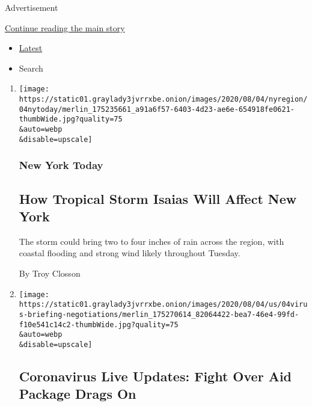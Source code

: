 Advertisement

\protect\hyperlink{after-mid1}{Continue reading the main story}

\begin{itemize}
\tightlist
\item
  \protect\hyperlink{stream-panel}{Latest}
\item
  Search
\end{itemize}

\begin{enumerate}
\def\labelenumi{\arabic{enumi}.}
\item
  \href{/2020/08/04/nyregion/isaias-tropical-storm-nyc.html}{}

  \texttt{[image: https://static01.graylady3jvrrxbe.onion/images/2020/08/04/nyregion/04nytoday/merlin\_175235661\_a91a6f57-6403-4d23-ae6e-654918fe0621-thumbWide.jpg?quality=75\\\&auto=webp\\\&disable=upscale]}

  \hypertarget{new-york-today-1}{%
  \subsubsection{New York Today}\label{new-york-today-1}}

  \hypertarget{how-tropical-storm-isaias-will-affect-new-york}{%
  \subsection{How Tropical Storm Isaias Will Affect New
  York}\label{how-tropical-storm-isaias-will-affect-new-york}}

  The storm could bring two to four inches of rain across the region,
  with coastal flooding and strong wind likely throughout Tuesday.~

  By Troy Closson
\item
  \href{/2020/08/04/world/coronavirus-covid-19.html}{}

  \texttt{[image: https://static01.graylady3jvrrxbe.onion/images/2020/08/04/us/04virus-briefing-negotiations/merlin\_175270614\_82064422-bea7-46e4-99fd-f10e541c14c2-thumbWide.jpg?quality=75\\\&auto=webp\\\&disable=upscale]}

  \hypertarget{coronavirus-live-updates-fight-over-aid-package-drags-on}{%
  \subsection{Coronavirus Live Updates: Fight Over Aid Package Drags
  On}\label{coronavirus-live-updates-fight-over-aid-package-drags-on}}


\end{enumerate}
